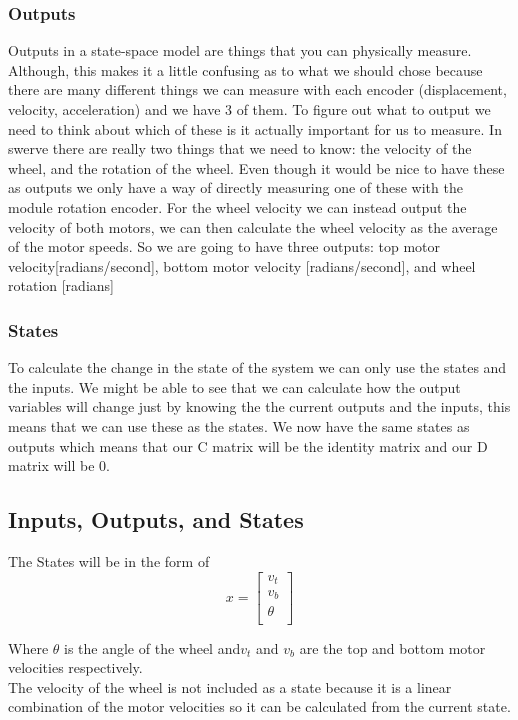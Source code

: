 \documentclass{scrartcl}
\begin{document}
\subsubsection*{Outputs}
Outputs in a state-space model are things that you can physically measure. Although, this makes it a little confusing as to what we should chose because there are many different things we can measure with each encoder (displacement, velocity, acceleration) and we have 3 of them. To figure out what to output we need to think about which of these is it actually important for us to measure.
In swerve there are really two things that we need to know: the velocity of the wheel, and the rotation of the wheel. Even though it would be nice to have these as outputs we only have a way of directly measuring one of these with the module rotation encoder. For the wheel velocity we can instead output the velocity of both motors, we can then calculate the wheel velocity as the average of the motor speeds.
So we are going to have three outputs: top motor velocity[radians/second], bottom motor velocity [radians/second], and wheel rotation [radians]

\subsubsection*{States}
To calculate the change in the state of the system we can only use the states and the inputs. We might be able to see that we can calculate how the output variables will change just by knowing the the current outputs and the inputs, this means that we can use these as the states. We now have the same states as outputs which means that our C matrix will be the identity matrix and our D matrix will be 0.

\subsection{Inputs, Outputs, and States}
The States will be in the form of
\begin{equation}
    x =
    \begin{bmatrix}
        v_t    \\
        v_b    \\
        \theta \\
    \end{bmatrix}
\end{equation}

Where \(\theta\) is the angle of the wheel and\(v_t\) and \(v_b\) are the top and bottom motor velocities respectively. \\
The velocity of the wheel is not included as a state because it is a linear combination of the motor velocities so it can be calculated from the current state.
\end{document}
